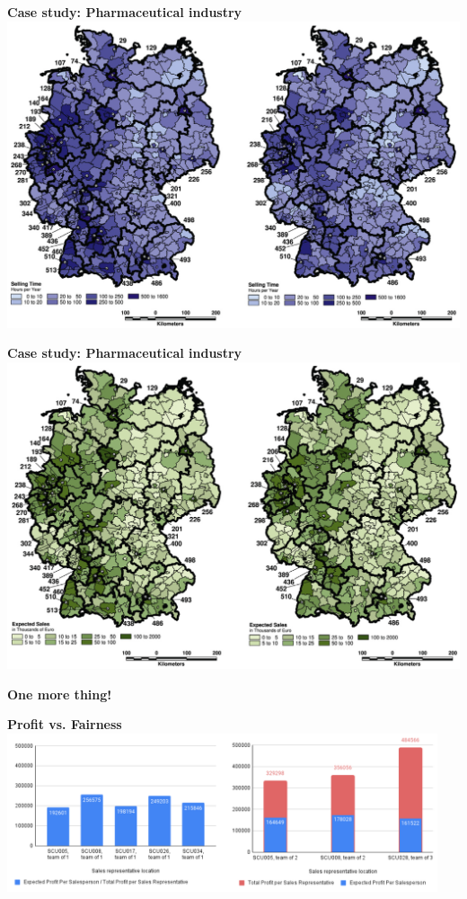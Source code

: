 \begin{frame}{\textbf{Case study: Pharmaceutical industry}}
\centering \includegraphics[width=.75\textwidth]{map2.png}
\end{frame}

\begin{frame}{\textbf{Case study: Pharmaceutical industry}}
\centering \includegraphics[width=.75\textwidth]{map3.png}
\end{frame}

\begin{frame}
  \centering
 \Large  \textbf{One more thing!}
\end{frame}

\begin{frame}{\textbf{Profit vs. Fairness}}
\centering\includegraphics[width=0.95\textwidth]{singleVsmulti.png}
\end{frame}


